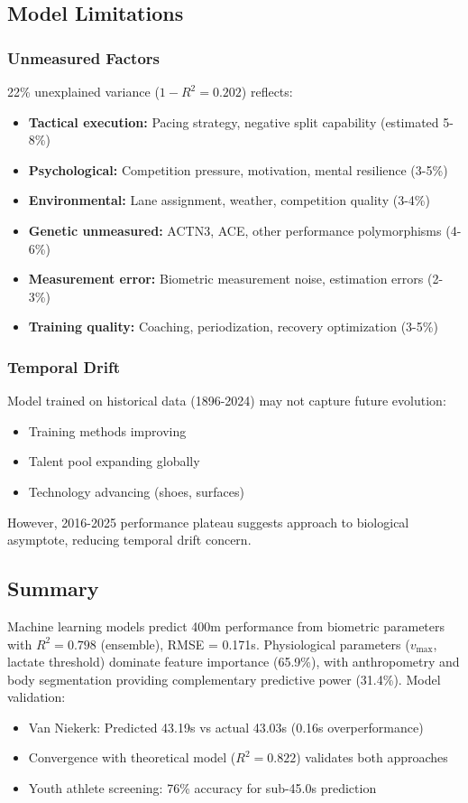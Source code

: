 \subsection{Model Limitations}

\subsubsection{Unmeasured Factors}

22\% unexplained variance ($1 - R^2 = 0.202$) reflects:
\begin{itemize}
    \item \textbf{Tactical execution:} Pacing strategy, negative split capability (estimated 5-8\%)
    \item \textbf{Psychological:} Competition pressure, motivation, mental resilience (3-5\%)
    \item \textbf{Environmental:} Lane assignment, weather, competition quality (3-4\%)
    \item \textbf{Genetic unmeasured:} ACTN3, ACE, other performance polymorphisms (4-6\%)
    \item \textbf{Measurement error:} Biometric measurement noise, estimation errors (2-3\%)
    \item \textbf{Training quality:} Coaching, periodization, recovery optimization (3-5\%)
\end{itemize}

\subsubsection{Temporal Drift}

Model trained on historical data (1896-2024) may not capture future evolution:
\begin{itemize}
    \item Training methods improving
    \item Talent pool expanding globally
    \item Technology advancing (shoes, surfaces)
\end{itemize}

However, 2016-2025 performance plateau suggests approach to biological asymptote, reducing temporal drift concern.

\subsection{Summary}

Machine learning models predict 400m performance from biometric parameters with $R^2 = 0.798$ (ensemble), RMSE = 0.171s. Physiological parameters ($v_{\max}$, lactate threshold) dominate feature importance (65.9\%), with anthropometry and body segmentation providing complementary predictive power (31.4\%). Model validation:
\begin{itemize}
    \item Van Niekerk: Predicted 43.19s vs actual 43.03s (0.16s overperformance)
    \item Convergence with theoretical model ($R^2 = 0.822$) validates both approaches
    \item Youth athlete screening: 76\% accuracy for sub-45.0s prediction
\end{itemize}

